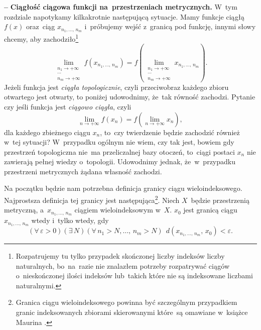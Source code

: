 \documentclass[a4paper,11pt]{article}
\newcommand{\ld}{\ldots}
\newcommand{\ra}{\rightarrow}
\newcommand{\wtw}{wtedy i~tylko wtedy}
\newcommand{\veps}{\varepsilon}
\newcommand{\Lim}{\lim\limits}
\newcommand{\tb}{\textbf}
\newcommand{\noi}{\noindent}
\newcommand{\start}{\noi \tb{--} {}}
\begin{document}
\start \tb{Ciągłość ciągowa funkcji na~przestrzeniach metrycznych.}
W~tym rozdziale napotykamy kilkakrotnie następującą sytuacje. Mamy
funkcje ciągłą $f( x )$ oraz~ciąg $x_{ n_{ 1 }, \ld, \, n_{ m } }$
i~próbujemy wejść z~granicą pod funkcję, innymi słowy chcemy, aby
zachodziło\footnote{Rozpatrujemy tu tylko przypadek skończonej liczby
  indeksów liczby naturalnych, bo~na~razie nie znalazłem potrzeby
  rozpatrywać ciągów o~nieskończonej ilości indeksów lub~takich które
  nie są indeksowane liczbami naturalnymi.}
\begin{equation*}
  \Lim_{ \substack{ n_{ 1 } \ra +\infty \\ \cdots \\  n_{ m } \ra +\infty } }
  f( x_{ n_{ 1 }, \ld, \, n_{ m } } )
  = f( \Lim_{ \substack{ n_{ 1 } \ra +\infty \\ \cdots \\ n_{ m } \ra +\infty } }
  x_{ n_{ 1 }, \ld, \, n_{ m } } ).
\end{equation*}
Jeżeli funkcja jest \emph{ciągła topologicznie}, czyli przeciwobraz
każdego zbioru otwartego jest otwarty, to poniżej udowodnimy, że~tak
równość zachodzi. Pytanie czy jeśli funkcja jest \emph{ciągowo
  ciągła}, czyli
\begin{equation*}
  \Lim_{ n \ra +\infty } f( x_{ n } ) = f( \Lim_{ n \ra +\infty } x_{ n } ),
\end{equation*}
dla każdego zbieżnego ciągu $x_{ n }$, to~czy twierdzenie będzie
zachodzić również w~tej sytuacji? W~przypadku ogólnym nie wiem, czy
tak jest, bowiem gdy przestrzeń topologiczna nie~ma przeliczalnej bazy
otoczeń, to~ciągi postaci $x_{ n }$ nie zawierają pełnej wiedzy
o~topologii. Udowodnimy jednak, że~w~przypadku przestrzeni metrycznych
żądana własność zachodzi.

Na początku będzie nam potrzebna definicja granicy ciągu
wieloindeksowego. Najprostsza definicja tej granicy jest
następująca\footnote{Granica ciągu wieloindeksowego powinna być
  szczególnym przypadkiem granic indeksowanych zbiorami skierowanymi
  które~są omawiane w~książce Maurina \cite{Maurin74}.}. Niech
$X$~będzie przestrzenią metryczną, a~$x_{ n_{ 1 }, \ld, \, n_{ m } }$
ciągiem wieloindeksowym w~$X$. $x_{ 0 }$ jest granicą ciągu
$x_{ n_{ 1 }, \ld, \, n_{ m } }$ \wtw, gdy
\begin{displaymath}
  ( \forall \, \veps > 0) ( \exists \, N )
  ( \forall \, n_{ 1 } > N, \ld, \, n_{ m } > N ) \;\,
  d( x_{ n_{ 1 }, \ld, \, n_{ m } }, \, x_{ 0 } ) < \veps.
\end{displaymath}
\end{document}
